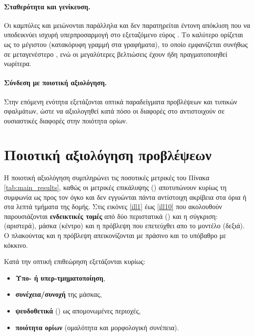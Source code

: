 \paragraph{Σταθερότητα και γενίκευση.}
Οι καμπύλες  και  μειώνονται παράλληλα και
δεν παρατηρείται έντονη απόκλιση που να υποδεικνύει ισχυρή υπερπροσαρμο\-γή στο
εξεταζόμενο εύρος . Το καλύτερο  ορίζεται ως το
 μέγιστου  (κατακόρυφη γραμμή στα
γραφήματα), το οποίο εμφανίζεται συνήθως σε μεταγενέστερο , ενώ οι
μεγαλύτερες βελτιώσεις έχουν ήδη πραγματοποιηθεί νωρίτερα.

\paragraph{Σύνδεση με ποιοτική αξιολόγηση.}
Στην επόμενη ενότητα εξετάζονται οπτικά παραδείγματα προβλέψεων και τυπικών
σφαλμάτων, ώστε να αξιολογηθεί κατά πόσο οι διαφορές στο 
αντιστοιχούν σε ουσιαστικές διαφορές στην ποιότητα ορίων.

\FloatBarrier


\section{Ποιοτική αξιολόγηση προβλέψεων}
\label{sec:results_qual}

Η ποιοτική αξιολόγηση συμπληρώνει τις ποσοτικές μετρικές του Πίνακα
\ref{tab:main_results}, καθώς οι μετρικές επικάλυψης ()
αποτυπώνουν κυρίως τη συμφωνία ως προς τον όγκο και δεν εγγυώνται πάντα
αντίστοιχη ακρίβεια στα όρια ή στα λεπτά τμήματα της δομής. Στις εικόνες \ref{ill1} έως \ref{ill10} 
που ακολουθούν παρουσιάζονται \textbf{ενδεικτικές τομές} από δύο περιστατικά
() και η σύγκριση:  (αριστερά), 
μάσκα (κέντρο) και η πρόβλεψη που επετεύχθει απο το μοντέλο (δεξιά). Ο πλακούντας και η πρόβλεψη 
απεικονίζονται με πράσινο και το υπόβαθρο με κόκκινο.

Κατά την οπτική επιθεώρηση εξετάζονται κυρίως:
\begin{itemize}
  \item \textbf{Υπο- ή υπερ-τμηματοποίηση},
  \item \textbf{συνέχεια/συνοχή} της μάσκας,
  \item \textbf{ψευδοθετικά} () ως απομονωμένες περιοχές,
  \item \textbf{ποιότητα ορίων} (ομαλότητα και μορφολογική συνέπεια).
\end{itemize}

